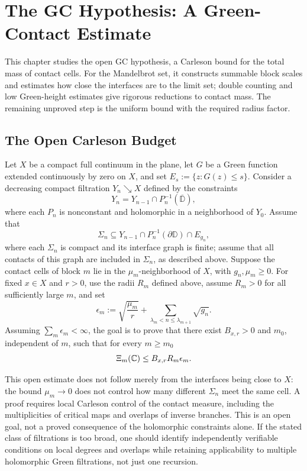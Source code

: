 \chapter{The GC Hypothesis: A Green-Contact Estimate}
\noindent This chapter studies the open GC hypothesis, a Carleson bound for the total mass of contact cells. For the Mandelbrot set, it constructs summable block scales and estimates how close the interfaces are to the limit set; double counting and low Green-height estimates give rigorous reductions to contact mass. The remaining unproved step is the uniform bound with the required radius factor.

\section{The Open Carleson Budget}

\begin{openestimate}
\label{thm:green-contact-carleson}
Let \(X\) be a compact full continuum in the plane, let \(G\) be a
Green function extended continuously by zero on \(X\), and set
\(E_s:=\{z:G(z)\le s\}\). Consider a decreasing compact filtration
\(Y_n\searrow X\) defined by the constraints
\[
 Y_n=Y_{n-1}\cap P_n^{-1}(\overline{\mathbb D}),
\]
where each \(P_n\) is nonconstant and holomorphic in a neighborhood of
\(Y_0\). Assume that
\[
 \Sigma_n\subseteq
 Y_{n-1}\cap P_n^{-1}(\partial\mathbb D)\cap E_{g_n},
\]
where each \(\Sigma_n\) is compact and its interface graph is finite;
assume that all contacts of this graph are included in \(\Sigma_n\), as
described above. Suppose the contact cells of block \(m\) lie in the
\(\mu_m\)-neighborhood of \(X\), with \(g_n,\mu_m\ge0\). For fixed
\(x\in X\) and \(r>0\), use the radii \(R_m\) defined above, assume
\(R_m>0\) for all sufficiently large \(m\), and set
\[
 \epsilon_m:=
 \sqrt{\frac{\mu_m}{r}}+
 \sum_{\lambda_m<n\le\lambda_{m+1}}\sqrt{g_n}.
\]
Assuming \(\sum_m\epsilon_m<\infty\), the goal is to prove that there
exist \(B_{x,r}>0\) and \(m_0\), independent of \(m\), such that for
every \(m\ge m_0\)
\begin{equation}
 \Xi_m(\mathbb C)\le B_{x,r} R_m\epsilon_m.
 \label{eq:green-contact-carleson}
\end{equation}
\end{openestimate}
This open estimate does not follow merely from the interfaces being
close to \(X\): the bound \(\mu_m\to0\) does not control how many
different \(\Sigma_n\) meet the same cell. A proof requires local
Carleson control of the contact measure, including the multiplicities
of critical maps and overlaps of inverse branches. This is an open
goal, not a proved consequence of the holomorphic constraints alone.
If the stated class of filtrations is too broad, one should identify
independently verifiable conditions on local degrees and overlaps while
retaining applicability to multiple holomorphic Green filtrations, not
just one recursion.

